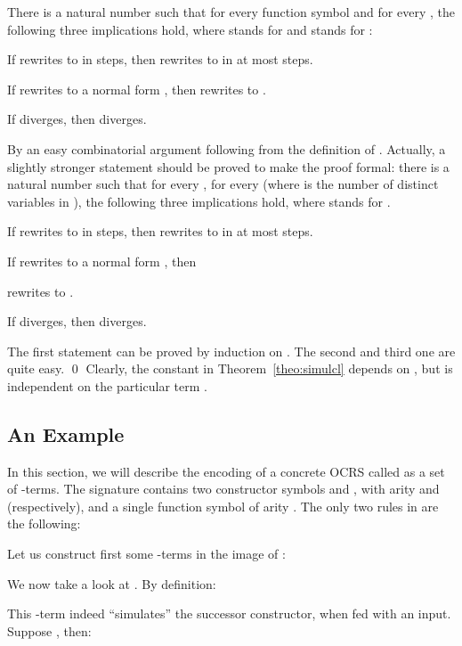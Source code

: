 \documentclass{LMCS}
\newenvironment{varitemize}
{
\begin{list}{\labelitemi}
{\setlength{\itemsep}{0.0mm}
 \setlength{\topsep}{0.0mm}
 \setlength{\parindent}{0.0mm}
 \setlength{\parskip}{0.0mm}
 \setlength{\parsep}{0.0mm}
 \setlength{\partopsep}{0.0mm}
 \setlength{\leftmargin}{15pt}
 \setlength{\labelsep}{5pt}
 \setlength{\labelwidth}{10pt}}}
{
 \end{list} 
}
\newcounter{number}
\begin{document}
\begin{thm}\label{theo:simulcl}
There is a natural number  such that for every
function symbol  and for every 
,
the following three implications hold, where
 stands for 
and  stands for 
:
\begin{varitemize}
\item
If  rewrites to
 in  steps, then
 rewrites to  in
at most  steps.
\item
If  rewrites to a normal form
, then
 rewrites to .
\item
If  diverges, then  diverges.
\end{varitemize}
\end{thm}
\proof
By an easy combinatorial argument following from the definition
of . Actually, a slightly stronger statement
should be proved to make the proof formal:
there is a natural number  such that for every ,
for every  (where  is 
the number of distinct variables in ),
the following three implications hold, where 
 stands for 
. 
\begin{varitemize}
\item
If  rewrites to
 in  steps, then
 rewrites to 
 in
at most  steps.
\item
If  rewrites to a normal form
, then
 
rewrites to .
\item
If  diverges, then 
 diverges.
\end{varitemize}
The first statement can be proved by induction on . The second and third one
are quite easy.
\qed
Clearly, the constant  in
Theorem~\ref{theo:simulcl} depends on , but is independent on the particular
term .
\subsection{An Example}\label{sect-EsempioTRStoLam}
\newcommand{\TRSadd}{\mathcal{ADD}}
\newcommand{\zero}{\mathbf{0}}
\newcommand{\suc}{\mathbf{s}}
\newcommand{\add}{\mathbf{add}}
In this section, we will describe the encoding of a concrete OCRS called  as a set of 
-terms. The signature  contains two constructor symbols
 and , with arity  and  (respectively), and a single function
symbol  of arity . The only two rules in  are the following:

Let us construct first some -terms in the image of :

We now take a look at . By definition:

This -term indeed ``simulates'' the successor constructor, when fed with an input. Suppose , then:
\end{document}
